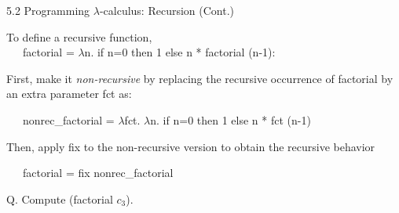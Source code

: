 \documentclass[table]{beamer}
\begin{document}
\begin{frame}[t]{5.2 Programming $\lambda$-calculus: Recursion (Cont.)} 

\vspace{10pt}

To define a recursive function, \\
 \ \ \ factorial = $\lambda$n. if n=0 then 1 else n * {\color{red}factorial} (n-1):

\vspace{10pt}
 
First, make it {\it non-recursive} by replacing the recursive occurrence of factorial by an extra parameter fct as:

\vspace{5pt}

 \ \ \ nonrec\_factorial = {\color{red} $\lambda$fct.} $\lambda$n. if n=0 then 1 else n * {\color{red}fct} (n-1)

\vspace{10pt}

Then, apply fix to the non-recursive version to obtain the recursive behavior

\vspace{5pt}

 \ \ \ factorial = fix nonrec\_factorial

\vspace{20pt}

Q. Compute (factorial $c_3$). 

\end{frame}
\end{document}
